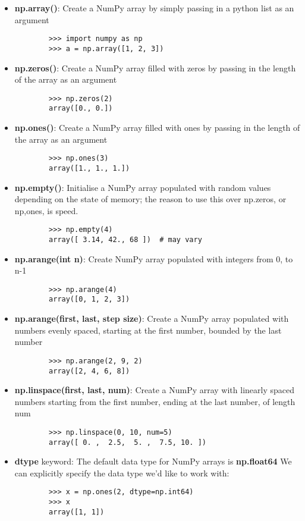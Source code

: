 \documentclass[12pt, a4paper]{article}
\begin{document}
\begin{itemize}
    \item \textbf{np.array()}: Create a NumPy array by simply passing in a python list as an argument
    \begin{lstlisting}
        >>> import numpy as np
        >>> a = np.array([1, 2, 3])
    \end{lstlisting}

    \item \textbf{np.zeros()}: Create a NumPy array filled with zeros by passing in the length of the array as an argument
    \begin{lstlisting}
        >>> np.zeros(2)
        array([0., 0.])
    \end{lstlisting}

    \item \textbf{np.ones()}: Create a NumPy array filled with ones by passing in the length of the array as an argument
    \begin{lstlisting}
        >>> np.ones(3)
        array([1., 1., 1.])
    \end{lstlisting}

    \item \textbf{np.empty()}: Initialise a NumPy array populated with random values depending on the state of memory; the reason to use this over np.zeros, or np,ones, is speed.
    \begin{lstlisting}
        >>> np.empty(4)
        array([ 3.14, 42., 68 ])  # may vary
    \end{lstlisting}

    \item \textbf{np.arange(int n)}: Create NumPy array populated with integers from 0, to n-1
    \begin{lstlisting}
        >>> np.arange(4)
        array([0, 1, 2, 3])
    \end{lstlisting}

    \item \textbf{np.arange(first, last, step size)}: Create a NumPy array populated with numbers evenly spaced, starting at the first number, bounded by the last number
    \begin{lstlisting}
        >>> np.arange(2, 9, 2)
        array([2, 4, 6, 8])
    \end{lstlisting}

    \item \textbf{np.linspace(first, last, num)}: Create a NumPy array with linearly spaced numbers starting from the first number, ending at the last number, of length num
    \begin{lstlisting}
        >>> np.linspace(0, 10, num=5)
        array([ 0. ,  2.5,  5. ,  7.5, 10. ])
    \end{lstlisting}

    \item \textbf{dtype} keyword: The default data type for NumPy arrays is \textbf{np.float64} We can explicitly specify the data type we'd like to work with:
    \begin{lstlisting}
        >>> x = np.ones(2, dtype=np.int64)
        >>> x
        array([1, 1])
    \end{lstlisting}
\end{itemize}
\end{document}
